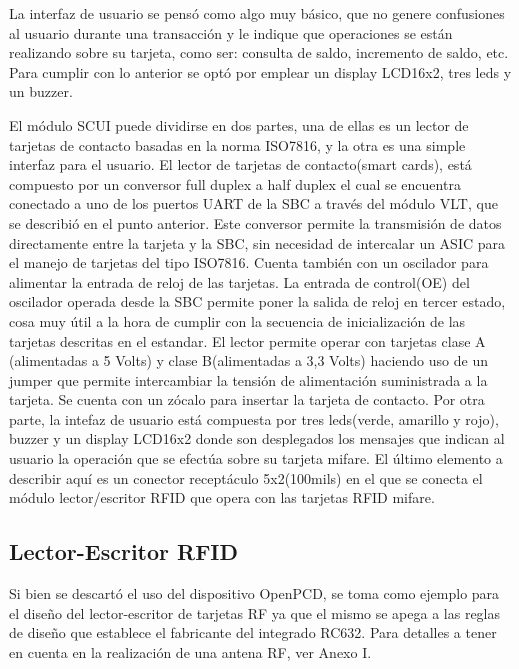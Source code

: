 La interfaz de usuario se pensó como algo muy básico, que no genere confusiones al usuario durante una transacción y le indique que operaciones se están realizando sobre su tarjeta, como ser: consulta de saldo, incremento de saldo, etc. Para cumplir con lo anterior se optó por emplear un display LCD16x2, tres leds y un buzzer.

\bigskip
\bigskip
\bigskip
El módulo SCUI puede dividirse en dos partes, una de ellas es un lector de tarjetas de contacto basadas en la norma ISO7816, y la otra es una simple interfaz para el usuario.
El lector de tarjetas de contacto(smart cards), está compuesto por un conversor full duplex a half duplex el cual se encuentra conectado a uno de los puertos UART de la SBC a través del módulo VLT, que se describió en el punto anterior. Este conversor permite la transmisión de datos directamente entre la tarjeta y la SBC, sin necesidad de intercalar un ASIC para el manejo de tarjetas del tipo ISO7816. Cuenta también con un oscilador para alimentar la entrada de reloj de las tarjetas. La entrada de control(OE) del oscilador operada desde la SBC permite poner la salida de reloj en tercer estado, cosa muy útil a la hora de cumplir con la secuencia de inicialización de las tarjetas descritas en el estandar. El lector permite operar con tarjetas clase A (alimentadas a 5 Volts) y clase B(alimentadas a 3,3 Volts) haciendo uso de un jumper que permite intercambiar la tensión de alimentación suministrada a la tarjeta. Se cuenta con un zócalo para insertar la tarjeta de contacto.
Por otra parte, la intefaz de usuario está compuesta por tres leds(verde, amarillo y rojo), buzzer y un display LCD16x2 donde son desplegados los mensajes que indican al usuario la operación que se efectúa sobre su tarjeta mifare.
El último elemento a describir aquí es un conector receptáculo 5x2(100mils) en el que se conecta el módulo lector/escritor RFID que opera con las tarjetas RFID mifare.

\subsection{Lector-Escritor RFID}
Si bien se descartó el uso del dispositivo OpenPCD, se toma como ejemplo para el
diseño del lector-escritor de tarjetas RF ya que el mismo se apega a las reglas de
diseño que establece el fabricante del integrado RC632.
Para detalles a tener en cuenta en la realización de una antena RF, ver Anexo I.



